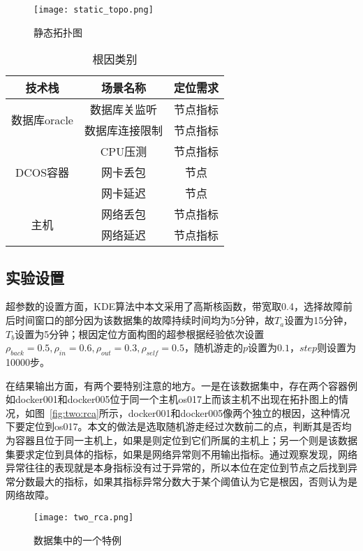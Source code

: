 \begin{figure}[htbp]
    \centering
    \texttt{[image: static\_topo.png]}
    \caption{静态拓扑图}
    \label{fig:static_topo}
  \end{figure}

\begin{table}
  \centering
  \begin{tabular}{ccc}
    \toprule
    技术栈 & 场景名称 & 定位需求\\
    \midrule
    \multirow{2}{*}{数据库oracle} & 数据库关监听 & 节点指标\\
     & 数据库连接限制 & 节点指标 \\
    \multirow{3}{*}{DCOS容器} & CPU压测 & 节点指标\\
     & 网卡丢包 & 节点\\
     & 网卡延迟 & 节点\\
    \multirow{2}{*}{主机} & 网络丢包& 节点指标\\
    & 网络延迟 & 节点指标\\
    \bottomrule
  \end{tabular}
  \caption{根因类别}
  \label{tab:error}
\end{table}

\subsection{实验设置}
超参数的设置方面，KDE算法中本文采用了高斯核函数，带宽取0.4，选择故障前后时间窗口的部分因为该数据集的故障持续时间均为5分钟，故$T_a$设置为15分钟，$T_b$设置为5分钟；根因定位方面构图的超参根据经验依次设置$\rho_{back}=0.5, \rho_{in} = 0.6, \rho_{out} = 0.3, \rho_{self} = 0.5$，随机游走的$p$设置为$0.1$，$step$则设置为10000步。

在结果输出方面，有两个要特别注意的地方。一是在该数据集中，存在两个容器例如docker001和docker005位于同一个主机os017上而该主机不出现在拓扑图上的情况，如图~\ref{fig:two:rca}所示，docker001和docker005像两个独立的根因，这种情况下要定位到os017。本文的做法是选取随机游走经过次数前二的点，判断其是否均为容器且位于同一主机上，如果是则定位到它们所属的主机上；另一个则是该数据集要求定位到具体的指标，如果是网络异常则不用输出指标。通过观察发现，网络异常往往的表现就是本身指标没有过于异常的，所以本位在定位到节点之后找到异常分数最大的指标，如果其指标异常分数大于某个阈值认为它是根因，否则认为是网络故障。

\begin{figure}[htbp]
  \centering
  \texttt{[image: two\_rca.png]}
  \caption{数据集中的一个特例}
  \label{fig:static_topo}
\end{figure}


